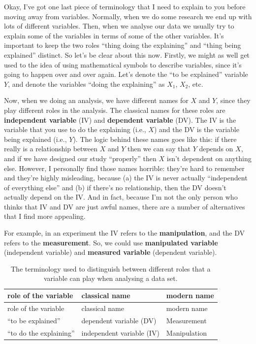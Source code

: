 \documentclass[]{book}
\begin{document}
Okay, I've got one last piece of terminology that I need to explain to you before moving away from variables. Normally, when we do some research we end up with lots of different variables. Then, when we analyse our data we usually try to explain some of the variables in terms of some of the other variables. It's important to keep the two roles ``thing doing the explaining'' and ``thing being explained'' distinct. So let's be clear about this now. Firstly, we might as well get used to the idea of using mathematical symbols to describe variables, since it's going to happen over and over again. Let's denote the ``to be explained'' variable \(Y\), and denote the variables ``doing the explaining'' as \(X_1\), \(X_2\), etc.

Now, when we doing an analysis, we have different names for \(X\) and \(Y\), since they play different roles in the analysis. The classical names for these roles are \textbf{independent variable} (IV) and \textbf{dependent variable} (DV). The IV is the variable that you use to do the explaining (i.e., \(X\)) and the DV is the variable being explained (i.e., \(Y\)). The logic behind these names goes like this: if there really is a relationship between \(X\) and \(Y\) then we can say that \(Y\) depends on \(X\), and if we have designed our study ``properly'' then \(X\) isn't dependent on anything else. However, I personally find those names horrible: they're hard to remember and they're highly misleading, because (a) the IV is never actually ``independent of everything else'' and (b) if there's no relationship, then the DV doesn't actually depend on the IV. And in fact, because I'm not the only person who thinks that IV and DV are just awful names, there are a number of alternatives that I find more appealing.

For example, in an experiment the IV refers to the \textbf{manipulation}, and the DV refers to the \textbf{measurement}. So, we could use \textbf{manipulated variable} (independent variable) and \textbf{measured variable} (dependent variable).

\begin{longtable}[]{@{}lll@{}}
\caption{The terminology used to distinguish between different roles that a variable can play when analysing a data set.}\tabularnewline
\toprule
role of the variable & classical name & modern name\tabularnewline
\midrule
\endfirsthead
\toprule
role of the variable & classical name & modern name\tabularnewline
\midrule
\endhead
``to be explained'' & dependent variable (DV) & Measurement\tabularnewline
``to do the explaining'' & independent variable (IV) & Manipulation\tabularnewline
\bottomrule
\end{longtable}
\end{document}
